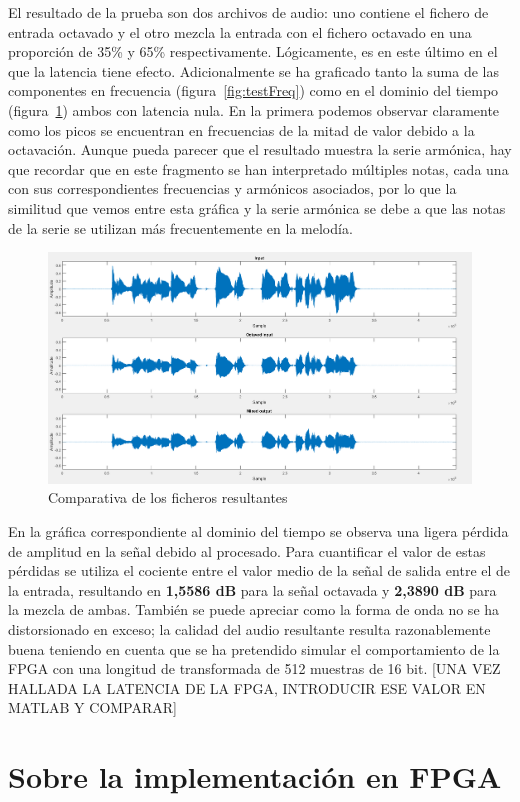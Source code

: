 El resultado de la prueba son dos archivos de audio: uno contiene el fichero de entrada octavado y el otro mezcla la entrada con el fichero octavado en una proporción de 35\% y 65\% respectivamente. Lógicamente, es en este último en el que la latencia tiene efecto. Adicionalmente se ha graficado tanto la suma de las componentes en frecuencia (figura~\ref{fig:testFreq}) como en el dominio del tiempo (figura~\ref{fig:testTime}) ambos con latencia nula. En la primera podemos observar claramente como los picos se encuentran en frecuencias de la mitad de valor debido a la octavación. Aunque pueda parecer que el resultado muestra la serie armónica, hay que recordar que en este fragmento se han interpretado múltiples notas, cada una con sus correspondientes frecuencias y armónicos asociados, por lo que la similitud que vemos entre esta gráfica y la serie armónica se debe a que las notas de la serie se utilizan más frecuentemente en la melodía. 

\begin{figure}[!bht]
\begin{center}
\includegraphics[width=15cm]{img/testAlTime.png}
\caption{\label{fig:testTime}Comparativa de los ficheros resultantes}
\end{center}
\end{figure}

En la gráfica correspondiente al dominio del tiempo se observa una ligera pérdida de amplitud en la señal debido al procesado. Para cuantificar el valor de estas pérdidas se utiliza el cociente entre el valor medio de la señal de salida entre el de la entrada, resultando en \textbf{1,5586 dB} para la señal octavada y \textbf{2,3890 dB} para la mezcla de ambas. También se puede apreciar como la forma de onda no se ha distorsionado en exceso; la calidad del audio resultante resulta razonablemente buena teniendo en cuenta que se ha pretendido simular el comportamiento de la FPGA con una longitud de transformada de 512 muestras de 16 bit.
[UNA VEZ HALLADA LA LATENCIA DE LA FPGA, INTRODUCIR ESE VALOR EN MATLAB Y COMPARAR]

\section{Sobre la implementación en FPGA}
